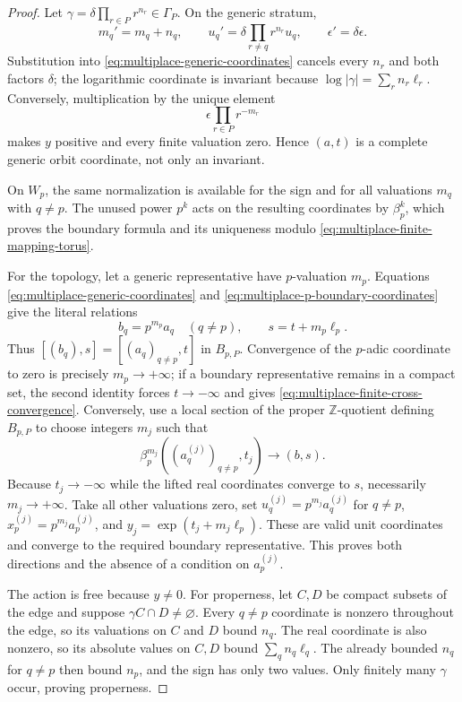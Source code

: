 \begin{proof}
Let $\gamma=\delta\prod_{r\in P}r^{n_r}\in\Gamma_P$.  On the generic
stratum,
\[
 m_q'=m_q+n_q,\qquad
 u_q'=\delta\!\prod_{r\ne q}r^{n_r}u_q,
 \qquad\epsilon'=\delta\epsilon.
\]
Substitution into \eqref{eq:multiplace-generic-coordinates} cancels every
$n_r$ and both factors $\delta$; the logarithmic coordinate is invariant
because $\log|\gamma|=\sum_rn_r\ell_r$.  Conversely, multiplication by the
unique element
\[
 \epsilon\prod_{r\in P}r^{-m_r}
\]
makes $y$ positive and every finite valuation zero.  Hence $(a,t)$ is a
complete generic orbit coordinate, not only an invariant.

On $W_p$, the same normalization is available for the sign and for all
valuations $m_q$ with $q\ne p$.  The unused power $p^k$ acts on the resulting
coordinates by $\beta_p^k$, which proves the boundary formula and its
uniqueness modulo \eqref{eq:multiplace-finite-mapping-torus}.

For the topology, let a generic representative have $p$-valuation $m_p$.
Equations \eqref{eq:multiplace-generic-coordinates} and
\eqref{eq:multiplace-p-boundary-coordinates} give the literal relations
\begin{equation}
 b_q=p^{m_p}a_q\quad(q\ne p),\qquad s=t+m_p\ell_p.
 \label{eq:multiplace-edge-coordinate-change}
\end{equation}
Thus $[(b_q),s]=[(a_q)_{q\ne p},t]$ in $B_{p,P}$.  Convergence of the
$p$-adic coordinate to zero is precisely $m_p\to+\infty$; if a boundary
representative remains in a compact set, the second identity forces
$t\to-\infty$ and gives \eqref{eq:multiplace-finite-cross-convergence}.
Conversely, use a local section of the proper $\mathbb Z$-quotient defining
$B_{p,P}$ to choose integers $m_j$ such that
\[
 \beta_p^{m_j}((a_q^{(j)})_{q\ne p},t_j)\longrightarrow(b,s).
\]
Because $t_j\to-\infty$ while the lifted real coordinates converge to $s$,
necessarily $m_j\to+\infty$.
Take all other valuations zero, set
$u_q^{(j)}=p^{m_j}a_q^{(j)}$ for $q\ne p$,
$x_p^{(j)}=p^{m_j}a_p^{(j)}$, and
$y_j=\exp(t_j+m_j\ell_p)$.  These are valid unit coordinates and converge to
the required boundary representative.  This proves both directions and the
absence of a condition on $a_p^{(j)}$.

The action is free because $y\ne0$.  For properness, let $C,D$ be compact
subsets of the edge and suppose $\gamma C\cap D\ne\varnothing$.  Every
$q\ne p$ coordinate is nonzero throughout the edge, so its valuations on
$C$ and $D$ bound $n_q$.  The real coordinate is also nonzero, so its absolute
values on $C,D$ bound $\sum_qn_q\ell_q$.  The already bounded $n_q$ for
$q\ne p$ then bound $n_p$, and the sign has only two values.  Only finitely
many $\gamma$ occur, proving properness.
\end{proof}

